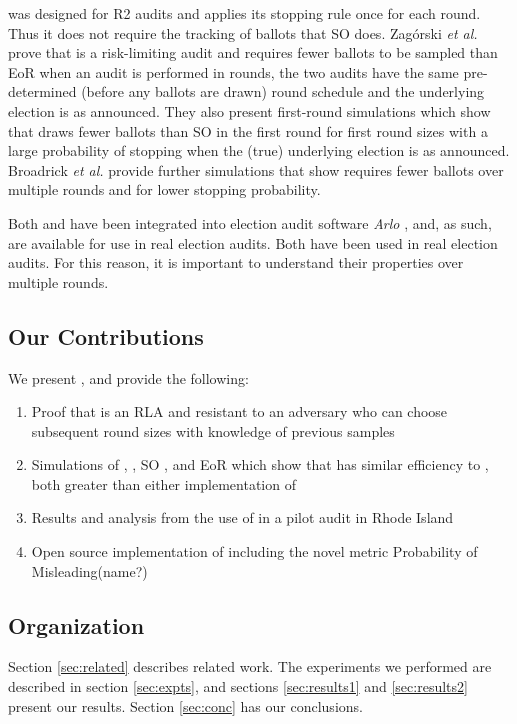 \Minerva was designed for R2 audits and applies its stopping rule once for each round. Thus it does not require the tracking of ballots that SO \BRAVO does. Zag{\'o}rski {\em et al.} \cite{usenix_minerva} prove that \Minerva is a risk-limiting audit and requires fewer ballots to be sampled than EoR \BRAVO when an audit is performed in rounds, the two audits have the same pre-determined (before any ballots are drawn) round schedule and the underlying election is as announced.
They also present first-round simulations which show that \Minerva draws fewer ballots than SO \BRAVO in the first round for first round sizes with a large probability of stopping when the (true) underlying election is as announced. 
Broadrick {\em et al.} provide further simulations that show \Minerva requires fewer ballots over multiple rounds and for lower stopping probability.

Both \BRAVO and \Minerva have been integrated into election audit software {\em Arlo} \cite{arlo}, and, as such, are available for use in real election audits. Both have been used in real election audits\cite{usenix_minerva, virginia_rla}. For this reason, it is important to understand their properties over multiple rounds. 

\subsection{Our Contributions}
We present \Providence, and provide the following:
\begin{enumerate}
\item Proof that \Providence is an RLA and resistant to an adversary who can choose subsequent round sizes with knowledge of previous samples
\item Simulations of \Providence, \Minerva, SO \BRAVO, and EoR \BRAVO which show that \Providence has similar efficiency to \Minerva, both greater than either implementation of \BRAVO
\item Results and analysis from the use of \Providence in a pilot audit in Rhode Island
\item Open source implementation of \Providence including the novel metric Probability of Misleading(name?)
\end{enumerate}

\subsection{Organization} 
Section \ref{sec:related} describes related work. The experiments we performed are described in section \ref{sec:expts}, and sections \ref{sec:results1} and \ref{sec:results2} present our results. Section \ref{sec:conc} has our conclusions. 

